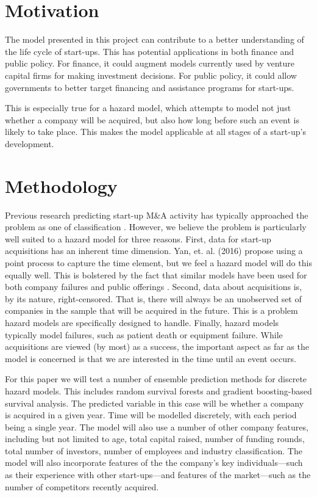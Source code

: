\section{Motivation}

The model presented in this project can contribute to a better understanding of the life cycle of start-ups. This has potential applications in both finance and public policy. For finance, it could augment models currently used by venture capital firms for making investment decisions. For public policy, it could allow governments to better target financing and assistance programs for start-ups.

This is especially true for a hazard model, which attempts to model not just whether a company will be acquired, but also how long before such an event is likely to take place. This makes the model applicable at all stages of a start-up's development.

\section{Methodology}

Previous research predicting start-up M\&A activity has typically approached the problem as one of classification \cite{xiang2012supervised}. However, we believe the problem is particularly well suited to a hazard model for three reasons. First, data for start-up acquisitions has an inherent time dimension. Yan, et. al. (2016) \cite{yan2016modeling} propose using a point process to capture the time element, but we feel a hazard model will do this equally well. This is bolstered by the fact that similar models have been used for both company failures and public offerings \cite{voia2017hazard, giot2007ipos}. Second, data about acquisitions is, by its nature, right-censored. That is, there will always be an unobserved set of companies in the sample that will be acquired in the future. This is a problem hazard models are specifically designed to handle. Finally, hazard models typically model failures, such as patient death or equipment failure. While acquisitions are viewed (by most) as a success, the important aspect as far as the model is concerned is that we are interested in the time until an event occurs.

For this paper we will test a number of ensemble prediction methods for discrete hazard models. This includes random survival forests and gradient boosting-based survival analysis. The predicted variable in this case will be whether a company is acquired in a given year. Time will be modelled discretely, with each period being a single year. The model will also use a number of other company features, including but not limited to age, total capital raised, number of funding rounds, total number of investors, number of employees and industry classification. The model will also incorporate features of the the company's key individuals---such as their experience with other start-ups---and features of the market---such as the number of competitors recently acquired.

